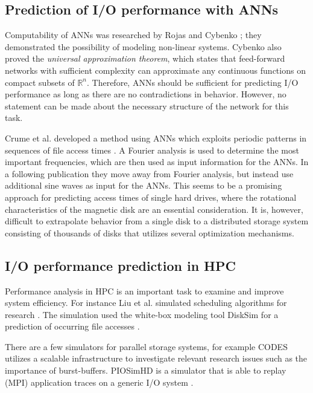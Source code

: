 \documentclass{superfri}
\begin{document}
	\subsection{Prediction of I/O performance with ANNs}
	Computability of ANNs was researched by Rojas \cite{Rojas:1996:NNS:235222} and Cybenko \cite{cybenko:mcss}; they demonstrated the  possibility of modeling non-linear systems. 
	Cybenko also proved the \textit{universal approximation theorem}, which states that feed-forward networks with sufficient complexity can approximate any continuous functions on compact subsets of $\mathbb{R}^n$.
	Therefore, ANNs should be sufficient for predicting I/O performance as long as there are no contradictions in behavior. 
	However, no statement can be made about the necessary structure of the network for this task.
	
	Crume et al. developed a method using ANNs which exploits periodic patterns in sequences of file access times \cite{Crume:2013:FML:2538542.2538561}.
	A Fourier analysis is used to determine the most important frequencies, which are then used as input information for the ANNs.
	In a following publication \cite{crumelatent} they move away from Fourier analysis, but instead use additional sine waves as input for the ANNs.
	This seems to be a promising approach for predicting access times of single hard drives, where the rotational characteristics of the magnetic disk are an essential consideration. 
	It is, however, difficult to extrapolate behavior from a single disk to a distributed storage system consisting of thousands of disks that utilizes several optimization mechanisms.
	
	\subsection{I/O performance prediction in HPC}
	Performance analysis in HPC is an important task to examine and improve system efficiency.
	For instance Liu et al. simulated scheduling algorithms for research \cite{liu2011towards}. 
	The simulation used the white-box modeling tool DiskSim for a prediction of occurring file accesses \cite{Bucy08thedisksim}.
	
	There are a few simulators for parallel storage systems, for example CODES\,\cite{cope2011codes} utilizes a scalable infrastructure to investigate relevant research issues such as the importance of burst-buffers.
	PIOSimHD is a simulator that is able to replay (MPI) application traces on a generic I/O system \cite{kunkel2013simulating}.
	
\end{document}
